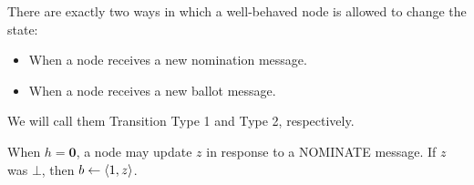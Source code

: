 There are exactly two ways in which a well-behaved node is allowed to change the state:
\begin{itemize}
    \item
        When a node receives a new nomination message.
    \item
        When a node receives a new ballot message.
\end{itemize}

We will call them Transition Type 1 and Type 2, respectively.

\begin{defn}\label{transition_type_1}
    When $h = \textbf{0}$, a node may update $z$ in response to a NOMINATE message.
    If $z$ was $\bot$, then $b \leftarrow \ev{1, z}$.
\end{defn}

